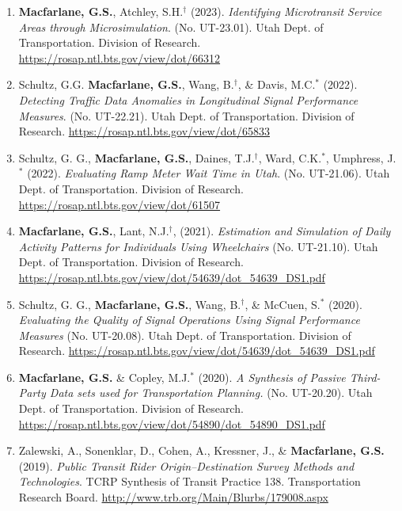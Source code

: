 \documentclass[margin,line]{res}
\newif\ifdetail
\newcounter{enuminitialize}
\newenvironment{myenum}[1][]
{%
 \setcounter{enuminitialize}{#1}
 \addtocounter{enuminitialize}{2}
 \begin{enumerate}[left= 4pt, itemsep=12pt, start=\value{enuminitialize}, label=\arabic*\addtocounter{enumi}{-2}]
}
{%
 \end{enumerate}
}
\begin{document}
\begin{resume}
\begin{myenum}[9]
\item  \textbf{Macfarlane, G.S.}, Atchley, S.H.$^\dagger$ (2023). \textit{Identifying Microtransit Service Areas through Microsimulation}. (No. UT-23.01). Utah Dept. of Transportation. Division of Research. \url{https://rosap.ntl.bts.gov/view/dot/66312}

\item Schultz, G.G. \textbf{Macfarlane, G.S.}, Wang, B.$^\dagger$, \& Davis, M.C.$^*$ (2022). \textit{Detecting Traffic Data Anomalies in
Longitudinal Signal Performance Measures}. (No. UT-22.21). Utah Dept. of Transportation. Division of Research. \url{https://rosap.ntl.bts.gov/view/dot/65833}

\item Schultz, G. G., \textbf{Macfarlane, G.S.}, Daines, T.J.$^\dagger$, Ward, C.K.$^*$, Umphress, J.$^*$ (2022). \textit{Evaluating Ramp Meter Wait Time in Utah}. (No. UT-21.06). Utah Dept. of Transportation. Division of Research. \url{https://rosap.ntl.bts.gov/view/dot/61507}

\item \textbf{Macfarlane, G.S.}, Lant, N.J.$^\dagger$, (2021). \textit{Estimation and Simulation of Daily Activity Patterns for Individuals Using Wheelchairs} (No. UT-21.10). Utah Dept. of Transportation. Division of Research. \url{https://rosap.ntl.bts.gov/view/dot/54639/dot_54639_DS1.pdf}

\item Schultz, G. G., \textbf{Macfarlane, G.S.}, Wang, B.$^\dagger$, \& McCuen, S.$^*$ (2020). \textit{Evaluating the Quality of Signal Operations Using Signal Performance Measures} (No. UT-20.08). Utah Dept. of Transportation. Division of Research. \url{https://rosap.ntl.bts.gov/view/dot/54639/dot_54639_DS1.pdf}

\item \textbf{Macfarlane, G.S.} \& Copley, M.J.$^*$ (2020). \textit{ A Synthesis of Passive Third-Party Data sets used for Transportation Planning.} (No. UT-20.20). Utah Dept. of Transportation. Division of Research. \url{https://rosap.ntl.bts.gov/view/dot/54890/dot_54890_DS1.pdf}

\item Zalewski, A., Sonenklar, D., Cohen, A., Kressner, J., \& \textbf{Macfarlane, G.S.} (2019). \textit{ Public Transit Rider Origin–Destination Survey Methods and Technologies}. TCRP Synthesis of Transit Practice 138. Transportation Research Board. \url{http://www.trb.org/Main/Blurbs/179008.aspx} \ifdetail Citations: 1  \fi


\end{myenum}
\end{resume}
\end{document}
